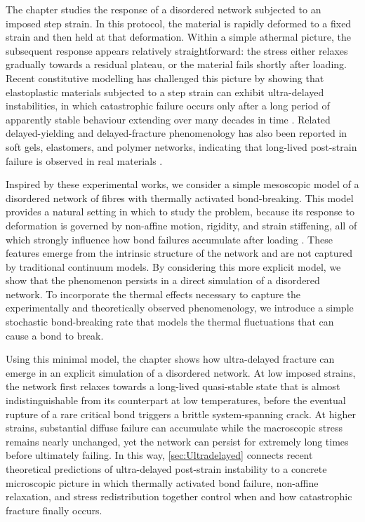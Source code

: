 \documentclass[asymmetricmargins]{library/duthesis}%
\begin{document}
The chapter studies the response of a disordered network subjected to an imposed step strain. In this protocol, the material is rapidly deformed to a fixed strain and then held at that deformation. Within a simple athermal picture, the subsequent response appears relatively straightforward: the stress either relaxes gradually towards a residual plateau, or the material fails shortly after loading. Recent constitutive modelling has challenged this picture by showing that elastoplastic materials subjected to a step strain can exhibit ultra-delayed instabilities, in which catastrophic failure occurs only after a long period of apparently stable behaviour extending over many decades in time \cite{lockwood_ultradelayed_2025}. Related delayed-yielding and delayed-fracture phenomenology has also been reported in soft gels, elastomers, and polymer networks, indicating that long-lived post-strain failure is observed in real materials \cite{sprakel_stress_2011,blindstrom_structures_2012,van_der_kooij_laser_2018,wangDelayedFractureGels2012,Ju2023}.

Inspired by these experimental works, we consider a simple mesoscopic model of a disordered network of fibres with thermally activated bond-breaking. This model provides a natural setting in which to study the problem, because its response to deformation is governed by non-affine motion, rigidity, and strain stiffening, all of which strongly influence how bond failures accumulate after loading \cite{shivers_strain-controlled_2023}. These features emerge from the intrinsic structure of the network and are not captured by traditional continuum models. By considering this more explicit model, we show that the phenomenon persists in a direct simulation of a disordered network. To incorporate the thermal effects necessary to capture the experimentally and theoretically observed phenomenology, we introduce a simple stochastic bond-breaking rate that models the thermal fluctuations that can cause a bond to break.

Using this minimal model, the chapter shows how ultra-delayed fracture can emerge in an explicit simulation of a disordered network. At low imposed strains, the network first relaxes towards a long-lived quasi-stable state that is almost indistinguishable from its counterpart at low temperatures, before the eventual rupture of a rare critical bond triggers a brittle system-spanning crack. At higher strains, substantial diffuse failure can accumulate while the macroscopic stress remains nearly unchanged, yet the network can persist for extremely long times before ultimately failing. In this way, \cref{sec:Ultradelayed} connects recent theoretical predictions of ultra-delayed post-strain instability to a concrete microscopic picture in which thermally activated bond failure, non-affine relaxation, and stress redistribution together control when and how catastrophic fracture finally occurs.
\end{document}
